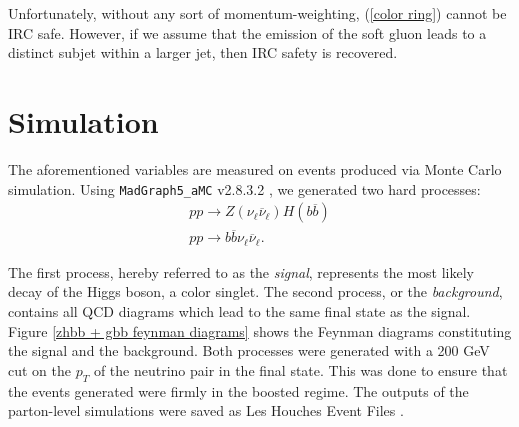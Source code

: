\documentclass[10pt,a4paper]{book}
\def\code#1{\texttt{#1}}
\begin{document}
Unfortunately, without any sort of momentum-weighting, (\ref{color ring}) cannot be IRC safe. However, if we assume that the emission of the soft gluon leads to a distinct subjet within a larger jet, then IRC safety is recovered.

\section{Simulation}
\label{Simulation}

The aforementioned variables are measured on events produced via Monte Carlo simulation. Using \code{MadGraph5\_aMC} v2.8.3.2 \cite{Alwall:2014hca}, we generated two hard processes:
\begin{gather}
p p \rightarrow Z(\nu_\ell \overline{\nu}_\ell) H(b\overline{b}) \\
p p \rightarrow b\overline{b} \nu_\ell \overline{\nu}_\ell.
\end{gather}

The first process, hereby referred to as the \emph{signal}, represents the most likely decay of the Higgs boson, a color singlet. The second process, or the \emph{background}, contains all QCD diagrams which lead to the same final state as the signal. Figure \ref{zhbb + gbb feynman diagrams} shows the Feynman diagrams constituting the signal and the background. Both processes were generated with a 200 GeV cut on the $p_T$ of the neutrino pair in the final state. This was done to ensure that the events generated were firmly in the boosted regime. The outputs of the parton-level simulations were saved as Les Houches Event Files \cite{Alwall:2006yp}.
\end{document}
